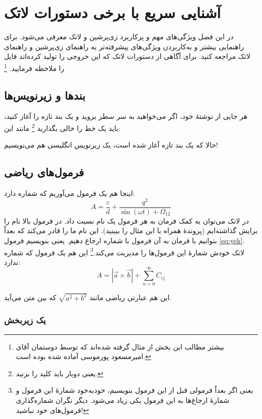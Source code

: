 \chapter{آشنایی سریع با برخی دستورات لاتک}
\label{app:latexIntro}

\thispagestyle{empty}
در این فصل ویژگی‌های مهم و پرکاربرد زی‌پرشین و لاتک معرفی می‌شود. برای راهنمایی بیشتر و به‌کاربردن ویژگی‌های پیشرفته‌تر به راهنمای زی‌پرشین و راهنمای لاتک مراجعه کنید. برای آگاهی از دستورات لاتک که این خروجی را تولید کرده‌اند فایل  را ملاحظه فرمایید.
\footnote{بیشتر مطالب این بخش از مثال 
گرفته شده‌اند که توسط دوستمان آقای امیرمسعود پورموسی آماده شده بوده است.}

\section{بندها و زیرنویس‌ها}
هر جایی از نوشتهٔ خود، اگر می‌خواهید به سر سطر بروید و یک بند تازه را آغاز کنید، باید یک خط را خالی بگذارید
\footnote{یعنی دوبار باید کلید  را بزنید.}
 مانند این:

حالا که یک بند تازه آغاز شده است، یک زیرنویس انگلیسی
 هم می‌نویسیم!
\section{فرمول‌های ریاضی}
\label{formula}

اینجا هم یک فرمول می‌آوریم که شماره دارد:
\begin{equation}\label{eq:yek}
A=\frac{c}{d}+\frac{q^2}{\sin(\omega t)+\Omega_{12}}
\end{equation}
در لاتک می‌توان به کمک فرمان 
به هر فرمول یک نام نسبت داد. در فرمول بالا نام  را برایش گذاشته‌ایم (پروندهٔ  همراه با این مثال را ببینید). این نام ما را قادر می‌کند که بعداً بتوانیم با فرمان
به آن فرمول با شماره ارجاع دهیم. یعنی بنویسیم فرمول \ref{eq:yek}. 
لاتک خودش شمارهٔ این فرمول‌ها را مدیریت می‌کند.\footnote{یعنی اگر بعداً فرمولی قبل از این فرمول بنویسیم، خودبه‌خود شمارهٔ این فرمول و شمارهٔ ارجاع‌ها به این فرمول یکی زیاد می‌شود. دیگر نگران شماره‌گذاری فرمول‌های خود نباشید!} این هم یک فرمول که شماره ندارد:
$$A=|\vec{a}\times \vec{b}| + \sum_{n=0}^\infty C_{ij}$$

این هم عبارتی ریاضی مانند 
$\sqrt{a^2+b^2}$
 که بین متن می‌آید.
\subsection{یک زیربخش}
\label{zirbakhsh}

